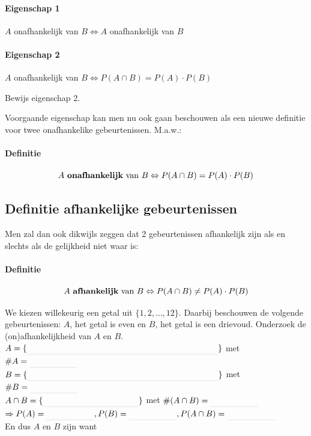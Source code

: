 \documentclass[12pt,twoside]{article}
\begin{document}
\paragraph*{Eigenschap 1} $A$ onafhankelijk van $B \Leftrightarrow A$ onafhankelijk van $B$

\paragraph*{Eigenschap 2} $A$ onafhankelijk van $B \Leftrightarrow P(A\cap B)=P(A)\cdot P(B)$

\begin{oefening}
Bewijs eigenschap 2.
\end{oefening}

Voorgaande eigenschap kan men nu ook gaan beschouwen als een nieuwe definitie voor twee onafhankelike gebeurtenissen. M.a.w.:

\paragraph*{Definitie}
\begin{mdframed}
$$A \mbox{ {\bf onafhankelijk} van } B \Leftrightarrow P(A\cap B)=P(A)\cdot P(B)$$
\end{mdframed}

\subsection{Definitie afhankelijke gebeurtenissen}

 Men zal dan ook dikwijls zeggen dat 2 gebeurtenissen afhankelijk zijn als en slechts als de gelijkheid niet waar is:

\paragraph*{Definitie}
\begin{mdframed}
$$A \mbox{ {\bf afhankelijk} van } B \Leftrightarrow P(A\cap B)\neq P(A)\cdot P(B)$$
\end{mdframed}

\begin{oefening} We kiezen willekeurig een getal uit $\{1,2,\ldots, 12\}$. Daarbij beschouwen de volgende gebeurtenissen: $A$, het getal is even en $B$, het getal is een drievoud. Onderzoek de (on)afhankelijkheid van $A$ en $B$.\\
$A=\{\arule{8cm}\}$ met $\#A=\arule{2cm}$\\
$B=\{\arule{8cm}\}$ met $\#B=\arule{2cm}$\\

$A\cap B=\{\arule{4cm}\}$ met $\#(A\cap B)=\arule{2cm}$\\

$\Rightarrow P(A)=\arule{2cm}, P(B)=\arule{2cm}, P(A\cap B)=\arule{2cm}$\\

En dus $A$ en $B$ zijn \arule{4cm} want \arule{4cm}
\end{oefening}
\end{document}
